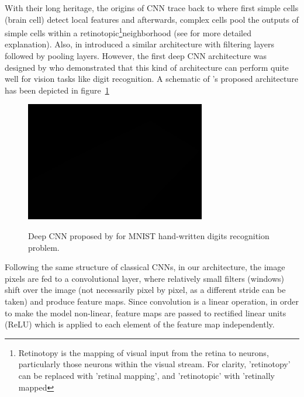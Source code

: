 With their long heritage, the origins of CNN trace back to \cite{hubel1962receptive} where first simple cells (brain cell) detect local features and afterwards, complex cells pool the outputs of simple cells within a retinotopic\footnote{Retinotopy is the mapping of visual input from the retina to neurons, particularly those neurons within the visual stream. For clarity, 'retinotopy' can be replaced with 'retinal mapping', and 'retinotopic' with 'retinally mapped}neighborhood (see \cite{hubel1962receptive} for more detailed explanation). Also, \citeauthor*{fukushima1975cognitron} in \cite{fukushima1975cognitron, fukushima1980neocognitron} introduced a similar architecture with filtering layers followed by pooling layers. However, the first deep CNN architecture was designed by \citealt{lecun1989backpropagation} who demonstrated that this kind of architecture can perform quite well for vision tasks like digit recognition. A schematic of \citeauthor{lecun1989backpropagation}'s proposed architecture has been depicted in figure~\ref{fig:lecun}

\begin{figure}[H]
	\centering
	{\includegraphics[width=0.7\textwidth]{images/1}}
	\caption{Deep CNN proposed by \citeauthor{lecun1989backpropagation} for MNIST hand-written digits recognition problem.}
	\label{fig:lecun}
\end{figure}

Following the same structure of classical CNNs, in our architecture, the image pixels are fed to a convolutional layer, where relatively small filters (windows) shift over the image (not necessarily pixel by pixel, as a different stride can be taken) and produce feature maps. Since convolution is a linear operation, in order to make the model non-linear, feature maps are passed to rectified linear units (ReLU) \cite{nair2010rectified} which is applied to each element of the feature map independently. 

